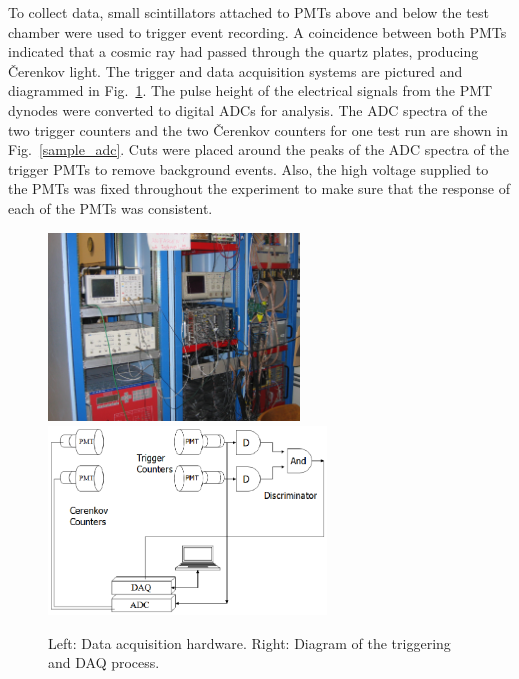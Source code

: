 To collect data, small scintillators attached to PMTs above and below
the test chamber were used to trigger event recording. A coincidence
between both PMTs indicated that a cosmic ray had passed through the
quartz plates, producing {\v C}erenkov light.  The trigger and data
acquisition systems are pictured and diagrammed in Fig.~\ref{trig_daq}.
The pulse height of the electrical signals from the PMT dynodes were
converted to digital ADCs for analysis. The ADC spectra of the two
trigger counters and the two {\v C}erenkov counters for one test run
are shown in Fig.~\ref{sample_adc}.  Cuts were placed around the peaks 
of the ADC spectra of the trigger PMTs to remove background events.  Also, 
the high voltage supplied to the PMTs was fixed throughout the experiment 
to make sure that the response of each of the PMTs was consistent. 

\begin{figure}
\vspace{0.5cm}\begin{centering}
\includegraphics[height=5.0cm]{PMT-studies/cerenk-daq.eps}
\includegraphics[height=5.0cm]{PMT-studies/daq.eps}
\vspace{0.5cm}
\caption{\small{Left: Data acquisition hardware. Right: Diagram of the 
triggering and DAQ process.}}
\label{trig_daq}
\end{centering}
\end{figure}

